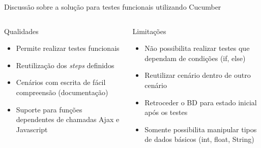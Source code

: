 \documentclass{beamer}
\begin{document}
\begin{frame}{Discussão sobre a solução para testes funcionais utilizando Cucumber}
     \begin{columns}[T] %
     \begin{column}[T]{5cm} %
        \begin{block}{Qualidades}
    	    \begin{itemize}
    	        \item Permite realizar testes funcionais
        		\item Reutilização dos \emph{steps} definidos
        		\item Cenários com escrita de fácil compreensão (documentação)
        		\item Suporte para funções dependentes de chamadas Ajax e Javascript
        	\end{itemize}
    	\end{block}
     \end{column}
     \begin{column}[T]{5cm} %
        \begin{alertblock}{Limitações}
            \begin{itemize}
            	\item Não possibilita realizar testes que dependam de condições (if, else)
            	\item Reutilizar cenário dentro de outro cenário
            	\item Retroceder o BD para estado inicial após os testes
            	\item Somente possibilita manipular tipos de dados básicos (int, float, String)
            \end{itemize}
        \end{alertblock}
     \end{column}
     \end{columns}
\end{frame}
\end{document}
